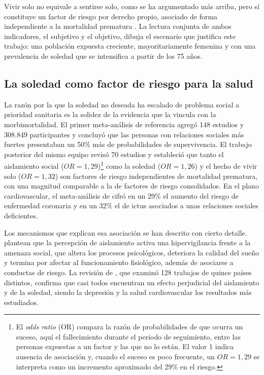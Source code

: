 Vivir solo no equivale a sentirse solo, como se ha argumentado más arriba, pero sí constituye un factor de riesgo por derecho propio, asociado de forma independiente a la mortalidad prematura \citep{HoltLunstad2015}. La lectura conjunta de ambos indicadores, el subjetivo y el objetivo, dibuja el escenario que justifica este trabajo: una población expuesta creciente, mayoritariamente femenina y con una prevalencia de soledad que se intensifica a partir de los 75 años.

\subsection{La soledad como factor de riesgo para la salud}

La razón por la que la soledad no deseada ha escalado de problema social a prioridad sanitaria es la solidez de la evidencia que la vincula con la morbimortalidad. El primer meta-análisis de referencia \citep{HoltLunstad2010} agregó 148 estudios y 308.849 participantes y concluyó que las personas con relaciones sociales más fuertes presentaban un 50\% más de probabilidades de supervivencia. El trabajo posterior del mismo equipo \citep{HoltLunstad2015} revisó 70 estudios y estableció que tanto el aislamiento social ($OR = 1{,}29$)\footnote{El \textit{odds ratio} (OR) compara la razón de probabilidades de que ocurra un suceso, aquí el fallecimiento durante el periodo de seguimiento, entre las personas expuestas a un factor y las que no lo están. El valor 1 indica ausencia de asociación y, cuando el suceso es poco frecuente, un $OR = 1{,}29$ se interpreta como un incremento aproximado del 29\% en el riesgo.} como la soledad ($OR = 1{,}26$) y el hecho de vivir solo ($OR = 1{,}32$) son factores de riesgo independientes de mortalidad prematura, con una magnitud comparable a la de factores de riesgo consolidados. En el plano cardiovascular, el meta-análisis de \textcite{Valtorta2016} cifró en un 29\% el aumento del riesgo de enfermedad coronaria y en un 32\% el de ictus asociados a unas relaciones sociales deficientes.

Los mecanismos que explican esa asociación se han descrito con cierto detalle. \textcite{Hawkley2010} plantean que la percepción de aislamiento activa una hiper\-vigilancia frente a la amenaza social, que altera los procesos psicológicos, deteriora la calidad del sueño y termina por afectar al funcionamiento fisiológico, además de asociarse a conductas de riesgo. La revisión de \textcite{Courtin2017}, que examinó 128 trabajos de quince países distintos, confirma que casi todos encuentran un efecto perjudicial del aislamiento y de la soledad, siendo la depresión y la salud cardiovascular los resultados más estudiados.

